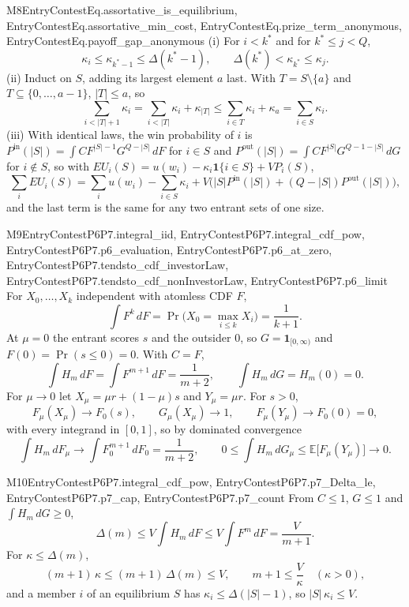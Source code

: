 \begin{mproof}{M8}{EntryContestEq.assortative_is_equilibrium, EntryContestEq.assortative_min_cost, EntryContestEq.prize_term_anonymous, EntryContestEq.payoff_gap_anonymous}
(i) For $i<k^*$ and for $k^*\le j<Q$,
\[
  \kappa_i\le\kappa_{k^*-1}\le\Delta(k^*-1),\qquad \Delta(k^*)<\kappa_{k^*}\le\kappa_j .
\]
(ii) Induct on $S$, adding its largest element $a$ last. With $T=S\setminus\{a\}$
and $T\subseteq\{0,\dots,a-1\}$, $|T|\le a$, so
\[
  \sum_{i<|T|+1}\kappa_i=\sum_{i<|T|}\kappa_i+\kappa_{|T|}
  \le\sum_{i\in T}\kappa_i+\kappa_a=\sum_{i\in S}\kappa_i .
\]
(iii) With identical laws, the win probability of $i$ is
$P^{\mathrm{in}}(|S|)=\int CF^{|S|-1}G^{Q-|S|}\,dF$ for $i\in S$ and
$P^{\mathrm{out}}(|S|)=\int CF^{|S|}G^{Q-1-|S|}\,dG$ for $i\notin S$, so with
$EU_i(S)=u(w_i)-\kappa_i\mathbf 1\{i\in S\}+V P_i(S)$,
\[
  \sum_iEU_i(S)=\sum_iu(w_i)-\sum_{i\in S}\kappa_i
  +V\big(|S|P^{\mathrm{in}}(|S|)+(Q-|S|)P^{\mathrm{out}}(|S|)\big),
\]
and the last term is the same for any two entrant sets of one size.
\end{mproof}

\begin{mproof}{M9}{EntryContestP6P7.integral_iid, EntryContestP6P7.integral_cdf_pow, EntryContestP6P7.p6_evaluation, EntryContestP6P7.p6_at_zero, EntryContestP6P7.tendsto_cdf_investorLaw, EntryContestP6P7.tendsto_cdf_nonInvestorLaw, EntryContestP6P7.p6_limit}
For $X_0,\dots,X_k$ independent with atomless CDF $F$,
\[
  \int F^k\,dF=\Pr\Big(X_0=\max_{i\le k}X_i\Big)=\frac1{k+1}.
\]
At $\mu=0$ the entrant scores $s$ and the outsider $0$, so
$G=\mathbf 1_{[0,\infty)}$ and $F(0)=\Pr(s\le0)=0$. With $C=F$,
\[
  \int H_m\,dF=\int F^{m+1}\,dF=\frac1{m+2},\qquad \int H_m\,dG=H_m(0)=0 .
\]
For $\mu\to0$ let $X_\mu=\mu r+(1-\mu)s$ and $Y_\mu=\mu r$. For $s>0$,
\[
  F_\mu(X_\mu)\to F_0(s),\qquad G_\mu(X_\mu)\to1,\qquad F_\mu(Y_\mu)\to F_0(0)=0,
\]
with every integrand in $[0,1]$, so by dominated convergence
\[
  \int H_m\,dF_\mu\to\int F_0^{m+1}\,dF_0=\frac1{m+2},\qquad
  0\le\int H_m\,dG_\mu\le\mathbb E\big[F_\mu(Y_\mu)\big]\to0 .
\]
\end{mproof}

\begin{mproof}{M10}{EntryContestP6P7.integral_cdf_pow, EntryContestP6P7.p7_Delta_le, EntryContestP6P7.p7_cap, EntryContestP6P7.p7_count}
From $C\le1$, $G\le1$ and $\int H_m\,dG\ge0$,
\[
  \Delta(m)\le V\int H_m\,dF\le V\int F^m\,dF=\frac V{m+1}.
\]
For $\kappa\le\Delta(m)$,
\[
  (m+1)\,\kappa\le(m+1)\,\Delta(m)\le V,\qquad m+1\le\frac V\kappa\quad(\kappa>0),
\]
and a member $i$ of an equilibrium $S$ has $\kappa_i\le\Delta(|S|-1)$, so
$|S|\,\kappa_i\le V$.
\end{mproof}

